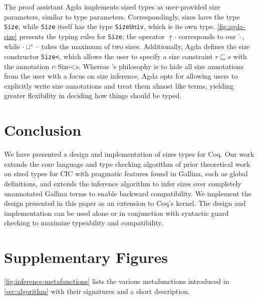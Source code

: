 \documentclass[acmsmall,nonacm,screen,review,anonymous,10pt]{acmart}
\begin{document}


The proof assistant Agda implements sized types as user-provided size parameters, similar to type parameters. Correspondingly, sizes have the type \texttt{Size}, while \texttt{Size} itself has the type \texttt{SizeUniv}, which is its own type. \autoref{fig:agda-size} presents the typing rules for \texttt{Size}; the operator $\uparrow \cdot$ corresponds to our $\hat{\cdot}$, while $\cdot \sqcup^s \cdot$ takes the maximum of two sizes. Additionally, Agda defines the size constructor \texttt{Size<}, which allows the user to specify a size constraint $r \sqsubseteq s$ with the annotation $r: \text{Size<} s$. Whereas \CIChat$ $'s philosophy is to hide all size annotations from the user with a focus on size inference, Agda opts for allowing users to explicitly write size annotations and treat them almost like terms, yielding greater flexibility in deciding how things should be typed.

\section{Conclusion}
\label{sec:conclusion}
We have presented a design and implementation of sizes types for Coq.
Our work extends the core language and type checking algorithm of prior theoretical work on sized types for CIC with pragmatic features found in Gallina, such as global definitions, and extends the inference algorithm to infer sizes over completely unannotated Gallina terms to enable backward compatibility. We implement the design presented in this paper as an extension to Coq's kernel\cite{impl}. The design and implementation can be used alone or in conjunction with syntactic guard checking to maximize typeability and compatibility.

\clearpage




\clearpage

\appendix

\section{Supplementary Figures}\label{sec:figures}



\autoref{fig:inference-metafunctions} lists the various metafunctions introduced in \autoref{sec:algorithm} with their signatures and a short description.
\end{document}
